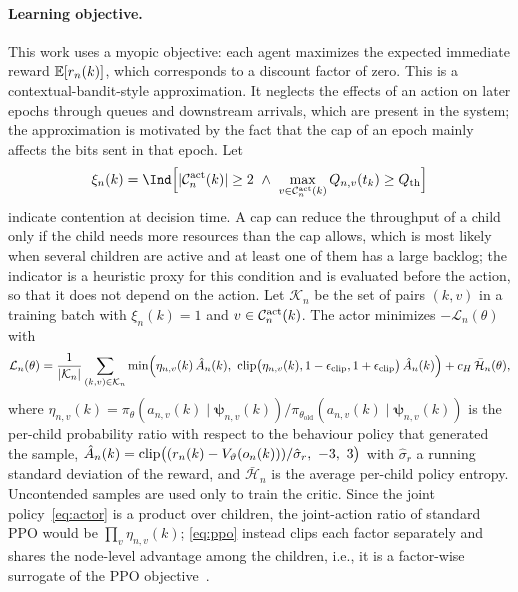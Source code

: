 \begin{EnChapter}
\paragraph{Learning objective.}
This work uses a myopic objective: each agent maximizes the expected immediate
reward $\mathbb{E}[r_n(k)]$, which corresponds to a discount factor of zero. This is a
contextual-bandit-style approximation. It neglects the effects of an action on
later epochs through queues and downstream arrivals, which
are present in the system; the approximation is motivated by the fact that the cap
of an epoch mainly affects the bits sent in that epoch. Let
\begin{equation}
  \xi_n(k) = \Ind\Bigl[ |\Cset_n^{\act}(k)| \ge 2 \ \wedge\ \max_{v \in \Cset_n^{\act}(k)} Q_{n,v}(t_k) \ge Q_{\mathrm{th}} \Bigr]
  \label{eq:contended}
\end{equation}
indicate contention at decision time. A cap can reduce the throughput of a child
only if the child needs more resources than the cap allows, which is most likely
when several children are active and at least one of them has a large backlog; the
indicator is a heuristic proxy for this condition and is evaluated before the
action, so that it does not depend on the action. Let $\mathcal{K}_n$ be the set of pairs $(k,v)$ in a
training batch with $\xi_n(k) = 1$ and $v \in \mathcal{C}_n^{\mathrm{act}}(k)$. The actor
minimizes $-\mathcal{L}_n(\theta)$ with
\begin{equation}
  \mathcal{L}_n(\theta) = \frac{1}{|\mathcal{K}_n|} \sum_{(k,v) \in \mathcal{K}_n} \min\Bigl( \eta_{n,v}(k)\, \hat A_n(k),\ \operatorname{clip}\bigl(\eta_{n,v}(k), 1 - \epsilon_{\mathrm{clip}}, 1 + \epsilon_{\mathrm{clip}}\bigr)\, \hat A_n(k) \Bigr) + c_H\, \bar{\mathcal{H}}_n(\theta),
  \label{eq:ppo}
\end{equation}
where
$\eta_{n,v}(k) = \pi_\theta(a_{n,v}(k) \mid \bm\psi_{n,v}(k)) / \pi_{\theta_{\mathrm{old}}}(a_{n,v}(k) \mid \bm\psi_{n,v}(k))$
is the per-child probability ratio with respect to the behaviour policy that
generated the sample,
$\hat A_n(k) = \operatorname{clip}\bigl( (r_n(k) - V_\vartheta(o_n(k)))/\hat\sigma_r,\ -3,\ 3 \bigr)$
with $\hat\sigma_r$ a running standard deviation of the reward, and
$\bar{\mathcal{H}}_n$ is the average per-child policy entropy. Uncontended samples
are used only to train the critic. Since the joint policy~\eqref{eq:actor} is a
product over children, the joint-action ratio of standard PPO would be
$\prod_{v} \eta_{n,v}(k)$; \eqref{eq:ppo} instead clips each factor separately and
shares the node-level advantage among the children, i.e., it is a factor-wise
surrogate of the PPO objective~\cite{schulman2017ppo}.


\end{EnChapter}
